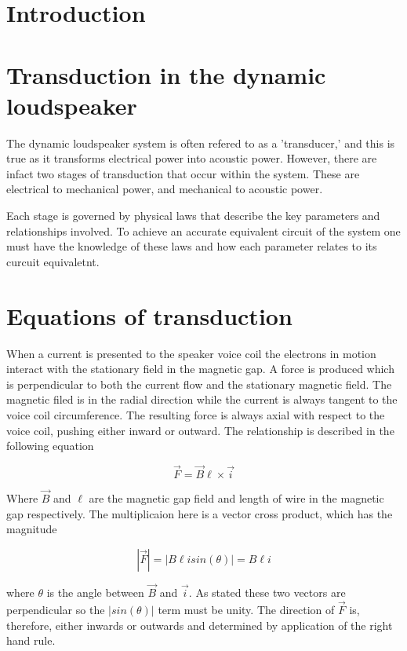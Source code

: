 \documentclass[11pt]{book}
\begin{document}
\section*{Introduction}

\section*{Transduction in the dynamic loudspeaker}

The dynamic loudspeaker system is often refered to as a 'transducer,'
and this is true as it transforms electrical power into acoustic
power.  However, there are infact two stages of transduction that
occur within the system.  These are electrical to mechanical power,
and mechanical to acoustic power.

Each stage is governed by physical laws that describe the key
parameters and relationships involved.  To achieve an accurate
equivalent circuit of the system one must have the knowledge of these
laws and how each parameter relates to its curcuit equivaletnt.

\section*{Equations of transduction}

When a current is presented to the speaker voice coil the electrons in
motion interact with the stationary field in the magnetic gap.  A
force is produced which is perpendicular to both the current flow and
the stationary magnetic field.  The magnetic filed is in the radial
direction while the current is always tangent to the voice coil
circumference.  The resulting force is always axial with
respect to the voice coil, pushing either inward or outward.  The
relationship is described in the following equation

\begin{equation*}
  \vec{F} = \vec{B} \ell \times \vec{i}
\end{equation*}

Where $\vec{B}$ and  $\ell$ are the magnetic gap field and length of wire
in the magnetic gap respectively.  The multiplicaion here is a vector
cross product, which has the magnitude

\begin{equation*}
  |\vec{F}| = |B\ell i sin(\theta)| = B\ell i
\end{equation*}

where $\theta$ is the angle between $\vec{B}$ and $\vec{i}$.  As
stated these two vectors are perpendicular so the $|sin(\theta)|$ term
must be unity.  The direction of $\vec{F}$ is, therefore, either
inwards or outwards and determined by application of the right hand
rule.
\end{document}
